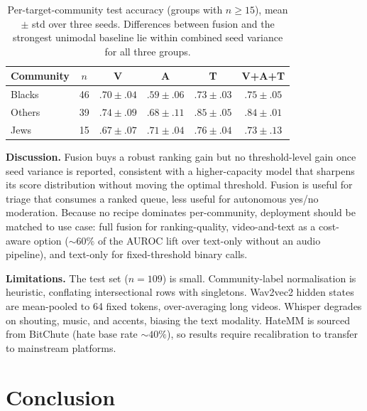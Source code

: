 \documentclass{article}
\begin{document}
\begin{table}[t]
\vskip 0.08in
\begin{center}
\begin{small}
\begin{sc}
\setlength{\tabcolsep}{3.5pt}
\begin{tabular}{lccccc}
\toprule
Community & $n$ & V & A & T & V+A+T \\
\midrule
Blacks & 46 & $.70{\pm}.04$ & $.59{\pm}.06$ & $.73{\pm}.03$ & $\mathbf{.75{\pm}.05}$ \\
Others & 39 & $.74{\pm}.09$ & $.68{\pm}.11$ & $\mathbf{.85{\pm}.05}$ & $.84{\pm}.01$ \\
Jews   & 15 & $.67{\pm}.07$ & $.71{\pm}.04$ & $\mathbf{.76{\pm}.04}$ & $.73{\pm}.13$ \\
\bottomrule
\end{tabular}
\caption{Per-target-community test accuracy (groups with $n \geq 15$), mean $\pm$ std over three seeds. Differences between fusion and the strongest unimodal baseline lie within combined seed variance for all three groups.}
\label{tab:community}
\end{sc}
\end{small}
\end{center}
\vskip -0.10in
\end{table}

\textbf{Discussion.} Fusion buys a robust ranking gain but no threshold-level gain once seed variance is reported, consistent with a higher-capacity model that sharpens its score distribution without moving the optimal threshold. Fusion is useful for triage that consumes a ranked queue, less useful for autonomous yes/no moderation. Because no recipe dominates per-community, deployment should be matched to use case: full fusion for ranking-quality, video-and-text as a cost-aware option (${\sim}60\%$ of the AUROC lift over text-only without an audio pipeline), and text-only for fixed-threshold binary calls.

\textbf{Limitations.} The test set ($n=109$) is small. Community-label normalisation is heuristic, conflating intersectional rows with singletons. Wav2vec2 hidden states are mean-pooled to 64 fixed tokens, over-averaging long videos. Whisper degrades on shouting, music, and accents, biasing the text modality. HateMM is sourced from BitChute (hate base rate ${\sim}40\%$), so results require recalibration to transfer to mainstream platforms.

\section{Conclusion}
\label{sec:conclusion}
\end{document}
